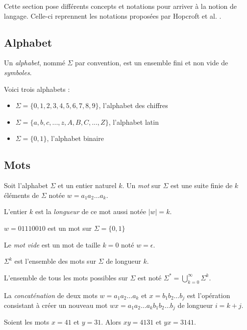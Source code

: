 Cette section pose différents concepts et notations pour arriver à la notion de langage. Celle-ci reprennent les notations proposées par Hopcroft et al. \cite{Hopcroft00}.

\subsection{Alphabet}

Un \emph{alphabet}, nommé $\Sigma$ par convention, est un ensemble fini et non vide de \emph{symboles}.

\begin{example} Voici trois alphabets : 
	\begin{itemize}
		\item $\Sigma = \{0,1,2,3,4,5,6,7,8,9\}$, l'alphabet des chiffres
		\item $\Sigma = \{a,b,c,...,z,A,B,C,...,Z\}$, l'alphabet latin
		\item $\Sigma = \{0,1\}$, l'alphabet binaire
	\end{itemize}
\end{example}


\subsection{Mots}

Soit l'alphabet $\Sigma$ et un entier naturel $k$. Un \emph{mot} sur $\Sigma$ est une suite finie de $k$ éléments de $\Sigma$ notée $ w = a_1a_2\dots a_k $.

L'entier $k$ est la \emph{longueur} de ce mot aussi notée $|w|=k$.

\begin{example}
	$w=01110010$ est un mot sur $\Sigma=\{0,1\}$
\end{example}


Le \emph{mot vide} est un mot de taille $k=0$ noté $w=\epsilon$.

$\Sigma^k$ est l'ensemble des mots sur $\Sigma$ de longueur $k$.
	
L'ensemble de tous les mots possibles sur $\Sigma$ est noté $\Sigma^* = \bigcup_{k=0}^{\infty}\Sigma^k$.

La \emph{concaténation} de deux mots $w=a_1a_2\dots a_k$ et $x=b_1b_2\dots b_j$ est l'opération consistant à créer un nouveau mot $wx=a_1a_2\dots a_kb_1b_2\dots b_j$ de longueur $i=k+j$.

\begin{example}
	Soient les mots $x=41$ et $y=31$. Alors $xy=4131$ et $yx=3141$.
\end{example}

